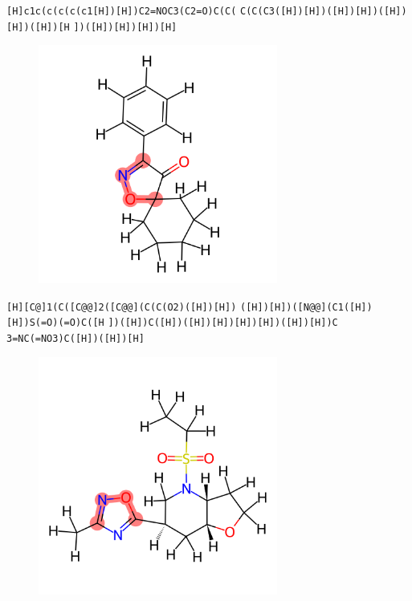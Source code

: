\documentclass{beamer}
\begin{document}
\begin{frame}[fragile]
\verb|[H]c1c(c(c(c(c1[H])[H])C2=NOC3(C2=O)C(C(|
\verb|C(C(C3([H])[H])([H])[H])([H])[H])([H])[H|
\verb|])([H])[H])[H])[H]|

\begin{figure}
    \includegraphics[width=0.7\textwidth,height=0.7\textheight,keepaspectratio]{mol06.png}
\end{figure}
\end{frame}
\begin{frame}[fragile]
\verb|[H][C@]1(C([C@@]2([C@@](C(C(O2)([H])[H])|
\verb|([H])[H])([N@@](C1([H])[H])S(=O)(=O)C([H|
\verb|])([H])C([H])([H])[H])[H])[H])([H])[H])C|
\verb|3=NC(=NO3)C([H])([H])[H]|

\begin{figure}
    \includegraphics[width=0.7\textwidth,height=0.7\textheight,keepaspectratio]{mol07.png}
\end{figure}
\end{frame}
\end{document}
